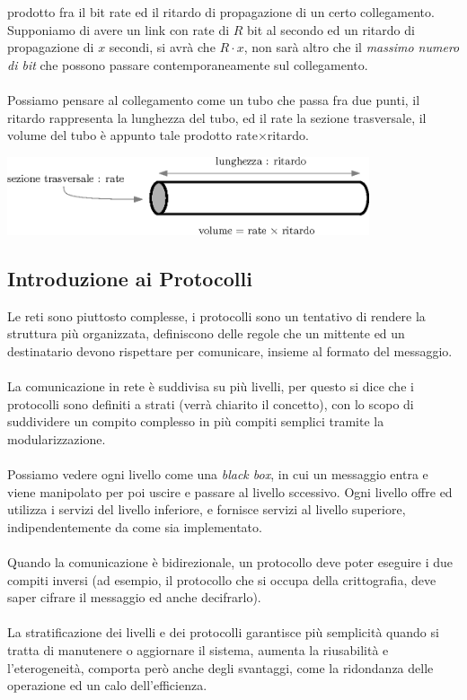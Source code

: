 \documentclass[12pt, letterpaper]{article}
\newcommand{\acc}{\\\hphantom{}\\}
\begin{document}
prodotto fra il bit rate ed il ritardo di propagazione di un certo
collegamento. Supponiamo di avere un link con rate di $R$ bit al secondo ed un ritardo di propagazione
di $x$ secondi, si avrà che $R\cdot x$, non sarà altro che il \textit{massimo numero di bit} che
possono passare contemporaneamente sul collegamento.\acc
Possiamo pensare al collegamento come un tubo che passa fra due punti, il ritardo rappresenta la lunghezza
del tubo, ed il rate la sezione trasversale, il volume del tubo è appunto tale prodotto rate$\times$ritardo.
\begin{center}
    \includegraphics[width=0.8\textwidth ]{images/tubo.eps}
\end{center}
\subsection{Introduzione ai Protocolli}
Le reti sono piuttosto complesse, i protocolli sono un tentativo di rendere la struttura più
organizzata, definiscono delle regole che un mittente ed un destinatario devono rispettare per
comunicare, insieme al formato del messaggio.\acc
La comunicazione in rete è suddivisa su più livelli, per questo si dice che i protocolli sono
definiti a strati (verrà chiarito il concetto), con lo scopo di suddividere un compito complesso
in più compiti semplici tramite la modularizzazione.\acc
Possiamo vedere ogni livello come una \textit{black box}, in cui un messaggio entra e viene
manipolato per poi uscire e passare al livello sccessivo. Ogni livello offre ed utilizza i servizi
del livello inferiore, e fornisce servizi al livello superiore, indipendentemente da come sia implementato. \acc
Quando la comunicazione è bidirezionale, un protocollo deve poter eseguire i due compiti inversi (ad esempio,
il protocollo che si occupa della crittografia, deve saper cifrare il messaggio ed anche decifrarlo).\acc
La stratificazione dei livelli e dei protocolli garantisce più semplicità quando si tratta di manutenere
o aggiornare il sistema, aumenta la riusabilità e l'eterogeneità, comporta però anche degli svantaggi,
come la ridondanza delle operazione ed un calo dell'efficienza.
\end{document}
